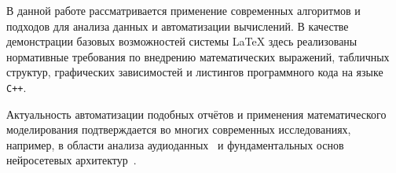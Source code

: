 В данной работе рассматривается применение современных алгоритмов и подходов для анализа данных и автоматизации вычислений. В качестве демонстрации базовых возможностей системы \LaTeX{} здесь реализованы нормативные требования по внедрению математических выражений, табличных структур, графических зависимостей и листингов программного кода на языке \texttt{C++}.

Актуальность автоматизации подобных отчётов и применения математического моделирования подтверждается во многих современных исследованиях, например, в области анализа аудиоданных~\cite{human_earing} и фундаментальных основ нейросетевых архитектур~\cite{attention}.
